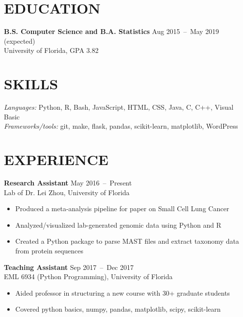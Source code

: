 \documentclass[line,resmargin]{res}
\begin{document}
\address{}
\address{}

\begin{resume}

\section{EDUCATION}
    \textbf{B.S. Computer Science and B.A. Statistics} \hfill Aug 2015~--~May 2019 (expected) \\
    University of Florida, GPA 3.82


\section{SKILLS}
    {\sl Languages:} Python, R, Bash, JavaScript, HTML, CSS, Java, C, C++, Visual Basic \\
    {\sl Frameworks/tools:} git, make, flask, pandas, scikit-learn, matplotlib, WordPress

\section{EXPERIENCE}
    \textbf{Research Assistant}    \hfill May 2016~--~Present \\
    Lab of Dr. Lei Zhou, University of Florida
    \begin{itemize}  \itemsep -2pt %
        \item Produced a meta-analysis pipeline for paper on Small Cell Lung Cancer
        \item Analyzed/visualized lab-generated genomic data using Python and R
        \item Created a Python package to parse MAST files and extract taxonomy data from protein sequences
    \end{itemize}

    \textbf{Teaching Assistant}    \hfill Sep 2017~--~Dec 2017 \\
    EML 6934 (Python Programming), University of Florida
    \begin{itemize}  \itemsep -2pt %
        \item Aided professor in structuring a new course with 30+ graduate students
        \item Covered python basics, numpy, pandas, matplotlib, scipy, scikit-learn
    \end{itemize}


\end{resume}
\end{document}
